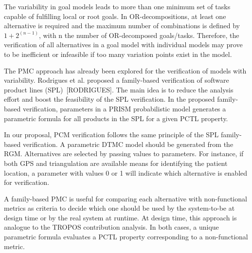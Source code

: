 The variability in goal models leads to more than one minimum set of tasks capable of fulfilling local or root goals. In OR-decompositions, at least one alternative is required and the maximum number of combinations is defined by $1 + 2^{(n-1)}$, with n the number of OR-decomposed goals/tasks. Therefore, the verification of all alternatives in a goal model with individual models may prove to be inefficient or infeasible if too many variation points exist in the model.

The PMC approach has already been explored for the verification of models with variability. Rodrigues et al. proposed a family-based verification of software product lines (SPL)~[RODRIGUES]. The main idea is to reduce the analysis effort and boost the feasibility of the SPL verification. In the proposed family-based verification, parameters in a PRISM probabilistic model generates a parametric formula for all products in the SPL for a given PCTL property. 

In our proposal, PCM verification follows the same principle of the SPL family-based verification. A parametric DTMC model should be generated from the RGM. Alternatives are selected by passing values to parameters. For instance, if both GPS and triangulation are available means for identifying the patient location, a parameter with values 0 or 1 will indicate which alternative is enabled for verification. 



A family-based PMC is useful for comparing each alternative with non-functional metrics as criteria to decide which one should be used by the system-to-be at design time or by the real system at runtime. At design time, this approach is analogue to the TROPOS contribution analysis. In both cases, a unique parametric formula evaluates a PCTL property corresponding to a non-functional metric.  %





